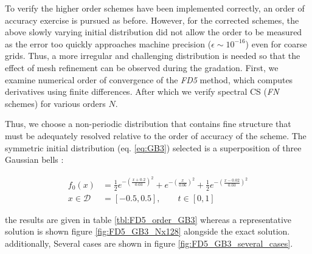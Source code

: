 \documentclass[11pt,titlepage]{report}
\begin{document}
To verify the higher order schemes have been implemented correctly, an order of accuracy exercise is pursued as before. However, for the corrected schemes, the above slowly varying initial distribution did not allow the order to be measured as the error too quickly approaches machine precision ($\epsilon \sim 10^{-16}$) even for coarse grids. Thus, a more irregular and challenging distribution is needed so that the effect of mesh refinement can be observed during the gradation. First, we examine numerical order of convergence of the \emph{FD5} method, which computes derivatives using finite differences. After which we verify spectral CS (\emph{FN} schemes) for various orders $N$.

Thus, we choose a non-periodic distribution that contains fine structure that must be adequately resolved relative to the order of accuracy of the scheme. The symmetric initial distribution (eq. \eqref{eq:GB3}) selected is a superposition of three Gaussian bells \cite{Guclu14}:

\begin{subequations}
\label{eq:GB3}
\begin{align}
f_0(x) & = \frac{1}{2}e^{-\left(\tfrac{x + 0.2}{0.03}\right)^2} + e^{-\left(\tfrac{x}{0.06}\right)^2} + \frac{1}{2}e^{-\left(\tfrac{x - 0.02}{0.03}\right)^2}  \\[0.8em]
x\in\mathcal{D} & = [-0.5, 0.5], \qquad t\in [0,1] 
\end{align}
\end{subequations}

\noindent the results are given in table \ref{tbl:FD5_order_GB3} whereas a representative solution is shown figure \ref{fig:FD5_GB3_Nx128} alongside the exact solution. additionally, Several cases are shown in figure \ref{fig:FD5_GB3_several_cases}.
\end{document}

